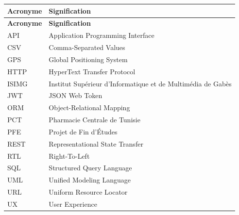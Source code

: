 \begin{longtable}{L{3cm}L{11cm}}
    \toprule
    \textbf{Acronyme} & \textbf{Signification} \\
    \midrule
    \endfirsthead
    \toprule
    \textbf{Acronyme} & \textbf{Signification} \\
    \midrule
    \endhead
    API & Application Programming Interface \\
    CSV & Comma-Separated Values \\
    GPS & Global Positioning System \\
    HTTP & HyperText Transfer Protocol \\
    ISIMG & Institut Supérieur d'Informatique et de Multimédia de Gabès \\
    JWT & JSON Web Token \\
    ORM & Object-Relational Mapping \\
    PCT & Pharmacie Centrale de Tunisie \\
    PFE & Projet de Fin d'Études \\
    REST & Representational State Transfer \\
    RTL & Right-To-Left \\
    SQL & Structured Query Language \\
    UML & Unified Modeling Language \\
    URL & Uniform Resource Locator \\
    UX & User Experience \\
    \bottomrule
\end{longtable}
